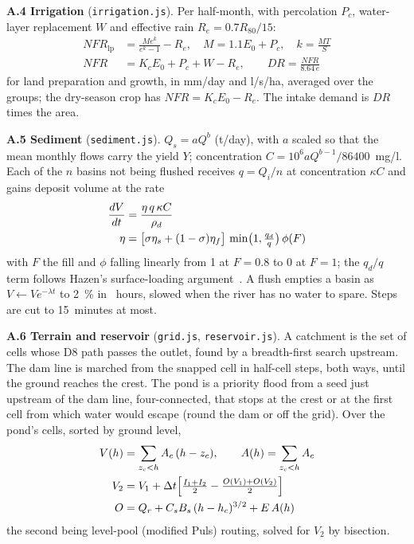 \documentclass[10pt,a4paper,twocolumn]{extarticle}
\begin{document}
\textbf{A.4 Irrigation} (\texttt{irrigation.js}). Per half-month, with percolation $P_c$, water-layer replacement
$W$ and effective rain $R_e=0.7R_{80}/15$:
\begin{align}
\mathit{NFR}_{\mathrm{lp}} &= \frac{M e^{k}}{e^{k}-1}-R_e,\quad M=1.1E_0+P_c,\quad k=\frac{MT}{S} \label{eq:nfr}\\
\mathit{NFR} &= K_cE_0+P_c+W-R_e,\qquad \mathit{DR}=\frac{\mathit{NFR}}{8.64\,e} \label{eq:dr}
\end{align}
for land preparation and growth, in mm/day and l/s/ha, averaged over the groups; the dry-season crop has
$\mathit{NFR}=K_cE_0-R_e$. The intake demand is $\mathit{DR}$ times the area.

\textbf{A.5 Sediment} (\texttt{sediment.js}). $Q_s=aQ^b$ (t/day), with $a$ scaled so that the mean monthly flows
carry the yield $Y$; concentration $C=10^6aQ^{b-1}/86400$~mg/l. Each of the $n$ basins not being flushed receives
$q=Q_i/n$ at concentration $\kappa C$ and gains deposit volume at the rate
\begin{align}
\frac{dV}{dt} &= \frac{\eta\,q\,\kappa C}{\rho_d} \label{eq:sed}\\
\eta &= \big[\sigma\eta_s+(1-\sigma)\eta_f\big]\,\min\!\big(1,\tfrac{q_d}{q}\big)\,\phi(F) \notag
\end{align}
with $F$ the fill and $\phi$ falling linearly from 1 at $F=0.8$ to 0 at $F=1$; the $q_d/q$ term follows Hazen's
surface-loading argument~\citep{hazen1904}. A flush empties a basin as $V\leftarrow Ve^{-\lambda t}$ to 2~\% in
\SedFlushHours~hours, slowed when the river has no water to spare. Steps are cut to 15~minutes at most.

\textbf{A.6 Terrain and reservoir} (\texttt{grid.js}, \texttt{reservoir.js}). A catchment is the set of cells whose
D8 path passes the outlet, found by a breadth-first search upstream. The dam line is marched from the snapped cell
in half-cell steps, both ways, until the ground reaches the crest. The pond is a priority flood from a seed just
upstream of the dam line, four-connected, that stops at the crest or at the first cell from which water would
escape (round the dam or off the grid). Over the pond's cells, sorted by ground level,
\begin{align}
V(h) &= \sum_{z_c<h}A_c\,(h-z_c),\qquad A(h)=\sum_{z_c<h}A_c \label{eq:curve}\\
V_2 &= V_1+\Delta t\Big[\tfrac{I_1+I_2}{2}-\tfrac{O(V_1)+O(V_2)}{2}\Big] \label{eq:puls}\\
O &= Q_r+C_sB_s\,(h-h_c)^{3/2}+E\,A(h) \notag
\end{align}
the second being level-pool (modified Puls) routing, solved for $V_2$ by bisection.
\end{document}
